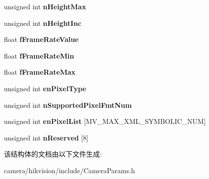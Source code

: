 \begin{DoxyCompactItemize}
unsigned int {\bfseries n\+Height\+Max}
\item 
\mbox{\label{struct___m_v___i_m_a_g_e___b_a_s_i_c___i_n_f_o___aa0f86165cf2060055ff3d55b79bbe898}} 
unsigned int {\bfseries n\+Height\+Inc}
\item 
\mbox{\label{struct___m_v___i_m_a_g_e___b_a_s_i_c___i_n_f_o___ad403abc7eb995a3777b90ca9422d124a}} 
float {\bfseries f\+Frame\+Rate\+Value}
\item 
\mbox{\label{struct___m_v___i_m_a_g_e___b_a_s_i_c___i_n_f_o___ae4fd9f488667869c9d215ae3826ace4c}} 
float {\bfseries f\+Frame\+Rate\+Min}
\item 
\mbox{\label{struct___m_v___i_m_a_g_e___b_a_s_i_c___i_n_f_o___ae36d596b4a5e15d9ed2bb5c2a5285fcc}} 
float {\bfseries f\+Frame\+Rate\+Max}
\item 
\mbox{\label{struct___m_v___i_m_a_g_e___b_a_s_i_c___i_n_f_o___a5a4b584e19bc320c26c4fa7382df00e0}} 
unsigned int {\bfseries en\+Pixel\+Type}
\item 
\mbox{\label{struct___m_v___i_m_a_g_e___b_a_s_i_c___i_n_f_o___a1dd23e88542e1594ce4d4042798d9992}} 
unsigned int {\bfseries n\+Supported\+Pixel\+Fmt\+Num}
\item 
\mbox{\label{struct___m_v___i_m_a_g_e___b_a_s_i_c___i_n_f_o___aa18a69a7cef35667cb14f55c5173c315}} 
unsigned int {\bfseries en\+Pixel\+List} \mbox{[}M\+V\+\_\+\+M\+A\+X\+\_\+\+X\+M\+L\+\_\+\+S\+Y\+M\+B\+O\+L\+I\+C\+\_\+\+N\+UM\mbox{]}
\item 
\mbox{\label{struct___m_v___i_m_a_g_e___b_a_s_i_c___i_n_f_o___a1d4ebeff557278ed23a207b74b5ec8c4}} 
unsigned int {\bfseries n\+Reserved} \mbox{[}8\mbox{]}
\end{DoxyCompactItemize}


该结构体的文档由以下文件生成\+:\begin{DoxyCompactItemize}
\item 
camera/hikvision/include/Camera\+Params.\+h\end{DoxyCompactItemize}
